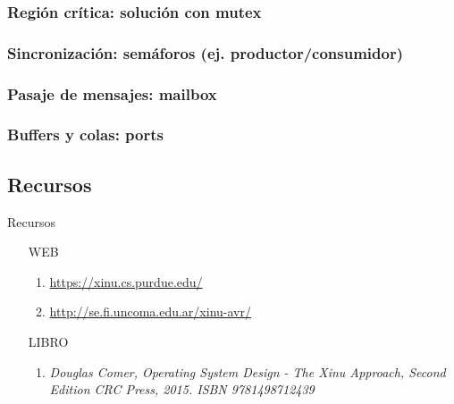 \documentclass[8pt,aspectratio=169,compress]{beamer}
\begin{document}
\subsubsection{Región crítica: solución con mutex}
\subsubsection{Sincronización: semáforos (ej. productor/consumidor)}
\subsubsection{Pasaje de mensajes: mailbox}
\subsubsection{Buffers y colas: ports}















\subsection{Recursos}




\begin{frame}{Recursos}

\begin{itemize}

\item [WEB]
\begin{enumerate}
\item \textcolor{blue}{\footnotesize \url{https://xinu.cs.purdue.edu/}}
\item \textcolor{blue}{\footnotesize \url{http://se.fi.uncoma.edu.ar/xinu-avr/}}
\end{enumerate}

\item [LIBRO]

\begin{enumerate}
\item \textit{Douglas Comer, Operating System Design - The Xinu Approach, Second Edition CRC Press, 2015. ISBN 9781498712439}
\end{enumerate}

\end{itemize}



\end{frame}
\end{document}
